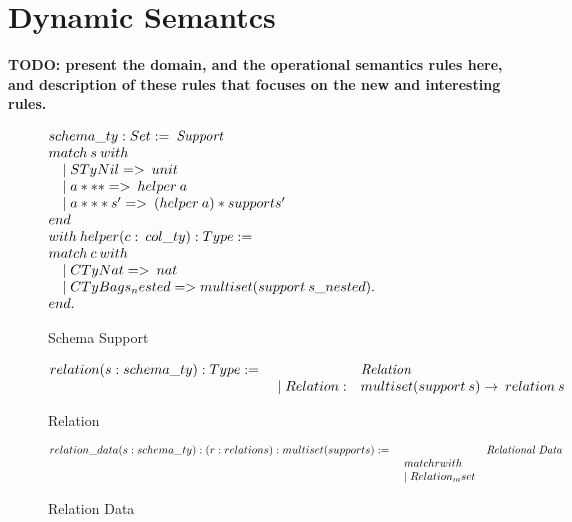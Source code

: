 \section{Dynamic Semantcs}
\label{sec:semantics}

{\bf TODO: present the domain, and the operational semantics rules here, 
and description of these rules that focuses on the new and interesting rules.}

\begin{figure}
\begin{center}
$\begin{array}{@{}l@{~}l@{\quad}l@{\!\!\!\!\!\!}r}
schema\_ty : Set := \:\emph{Support} \\
match \:s \:with & &\\
\quad \mid STyNil => \:unit\\
\quad \mid a *** => \:helper \:a\\
\quad \mid a *** s' => \: (helper \:a) * support s' \\
end \\
with \:helper(c: \:col\_ty) : Type := & & \\
match \:c \:with \\
\quad \mid CTyNat => \:nat\\
\quad \mid CTyBag s_nested => multiset (support \:s\_nested). \\
end.
\end{array}
$
\end{center}
\caption{Schema Support}
\label{fig-schema_support}
\end{figure}

\begin{figure}
\begin{center}
$\begin{array}{@{}l@{~}l@{\quad}l@{\!\!\!\!\!\!}r}
relation (s: schema\_ty): Type := & \ \ \ \ \ & \emph{Relation} \\
& \quad \mid Relation: & multiset(support \:s) \rightarrow \: relation \:s\\
\end{array}
$
\end{center}
\caption{Relation}
\label{fig-relation}
\end{figure}

\begin{figure}
\begin{center}
$\begin{array}{@{}l@{~}l@{\quad}l@{\!\!\!\!\!\!}r}
relation\_data (s: schema\_ty): (r: relation s) : multiset(support s) := & \ \ \ \ \ & \emph{Relational Data} \\
& \quad match r with\\
& \quad \mid Relation_mset 
\end{array}
$
\end{center}
\caption{Relation Data}
\label{fig-relationdata}
\end{figure}
